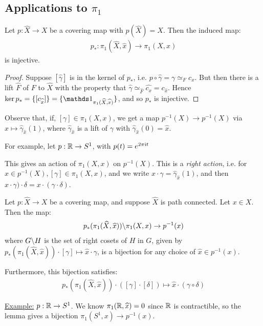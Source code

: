 \documentclass[10pt,a4paper]{article}
\begin{document}
\subsection*{Applications to $\pi_1$}
\begin{lemma}
Let $p:\hat{X}\to X$ be a covering map with $p(\hat{X}) = X$. Then the induced map:
\begin{align*}
p_\ast: \pi_1(\hat{X}, \hat{x}) \to \pi_1(X, x)
\end{align*}
is injective.
\end{lemma}
\begin{proof}
Suppose $[\hat{\gamma}]$ is in the kernel of $p_\ast$, i.e. $p\circ \hat{\gamma} = \gamma \simeq_F c_x$. But then there is a lift $\hat{F}$ of $F$ to $\hat{X}$ with the property that $\hat{\gamma} \simeq_{\hat{F}} \hat{c_x} = c_{\hat{x}}$. Hence $\ker p_\ast = \{[c_{\hat{x}}]\} = \{\one_{\pi_1(\hat{X},\hat{x})}\}$, and so $p_\ast$ is injective. 
\end{proof}

Observe that, if, $[\gamma] \in \pi_1(X,x)$, we get a map $p^{-1}(X) \to p^{-1}(X)$ via $\hat{x} \mapsto \hat{\gamma}_{\hat{x}}(1)$, where $\hat{\gamma}_{\hat{x}}$ is a lift of $\gamma$ with $\hat{\gamma}_{\hat{x}}(0) = \hat{x}$.

For example, let $p:\mathbb{R} \to S^1$, with $p(t) = e^{2\pi\mathfrak{i} t}$

This gives an action of $\pi_1(X,x)$ on $p^{-1}(X)$. This is a \emph{right action}, i.e. for $\hat{x}\in p^{-1}(X), [\gamma]\in \pi_1(X,x)$, and we write $x\cdot \gamma=  \hat{\gamma}_{\hat{x}}(1)$, and then $x\cdot \gamma)\cdot \delta = x \cdot ( \gamma \cdot \delta)$.

\begin{lemma}
Let $p:\hat{X} \to X$ be a covering map, and suppose $\hat{X}$ is path connected. Let $x \in X$. Then the map:
\begin{align*}
p_\ast(\pi_1(\widehat{X},\widehat{x}))\backslash \pi_1(X,x) \to p^{-1}(x)
\end{align*}
where $G\backslash H$ is the set of right cosets of $H$ in $G$, given by $p_\ast(\pi_1(\hat{X}, \hat{x}))\cdot [\gamma] \mapsto \hat{x}\cdot \gamma$, is a bijection for any choice of $\hat{x} \in p^{-1}(x)$.

Furthermore, this bijection satisfies:
\begin{align*}
p_{\ast}(\pi_1(\hat{X},\hat{x}))\cdot ([\gamma]\cdot[\delta]) \mapsto \hat{x}\cdot(\gamma \circ \delta)
\end{align*}
\end{lemma}
\underline{Example:} $p:\mathbb{R} \to S^1$. We know $\pi_1(\mathbb{R}, \widehat{x})=0$ since $\mathbb{R}$ is contractible, so the lemma gives a bijection $\pi_1(S^1,x) \to p^{-1}(x)$.
\end{document}
